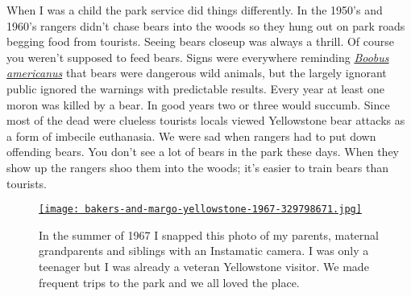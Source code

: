 When I was a child the park service did things differently. In the
1950's and 1960's rangers didn't chase bears into the woods so they hung
out on park roads begging food from tourists. Seeing bears closeup was
always a thrill. Of course you weren't supposed to feed bears. Signs
were everywhere reminding
\href{http://www.urbandictionary.com/define.php?term=Boobus\%20Americanus}{\emph{Boobus
americanus}} that bears were dangerous wild animals, but the largely
ignorant public ignored the warnings with predictable results. Every
year at least one moron was killed by a bear. In good years two or three
would succumb. Since most of the dead were clueless tourists locals
viewed Yellowstone bear attacks as a form of imbecile euthanasia. We
were sad when rangers had to put down offending bears. You don't see a
lot of bears in the park these days. When they show up the rangers shoo
them into the woods; it's easier to train bears than tourists.




\captionsetup[figure]{labelformat=empty}

\begin{SCfigure}
\centering
\href{http://conceptcontrol.smugmug.com/People/The-Way-We-Were/i-xCDHX8z/A}{\texttt{[image: bakers-and-margo-yellowstone-1967-329798671.jpg]}}
\caption{In the summer of 1967 I snapped this photo of my parents, maternal
grandparents and siblings with an Instamatic camera. I was only a
teenager but I was already a veteran Yellowstone visitor. We made
frequent trips to the park and we all loved the place.}
\label{fig:4186X1}
\end{SCfigure}

